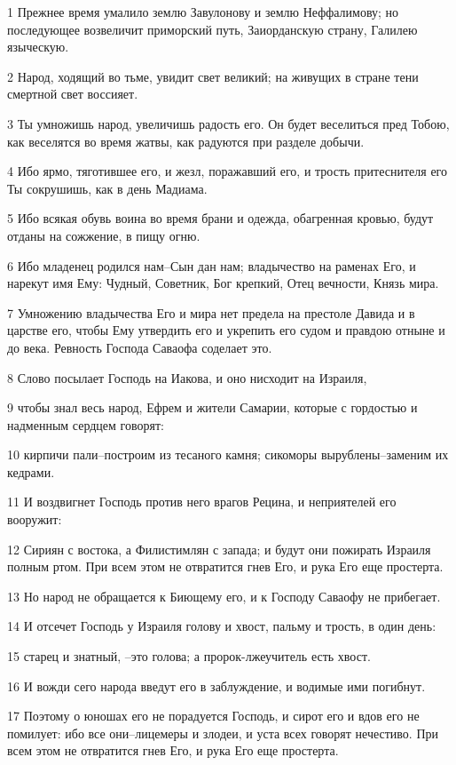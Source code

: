 \par 1 Прежнее время умалило землю Завулонову и землю Неффалимову; но последующее возвеличит приморский путь, Заиорданскую страну, Галилею языческую.
\par 2 Народ, ходящий во тьме, увидит свет великий; на живущих в стране тени смертной свет воссияет.
\par 3 Ты умножишь народ, увеличишь радость его. Он будет веселиться пред Тобою, как веселятся во время жатвы, как радуются при разделе добычи.
\par 4 Ибо ярмо, тяготившее его, и жезл, поражавший его, и трость притеснителя его Ты сокрушишь, как в день Мадиама.
\par 5 Ибо всякая обувь воина во время брани и одежда, обагренная кровью, будут отданы на сожжение, в пищу огню.
\par 6 Ибо младенец родился нам--Сын дан нам; владычество на раменах Его, и нарекут имя Ему: Чудный, Советник, Бог крепкий, Отец вечности, Князь мира.
\par 7 Умножению владычества Его и мира нет предела на престоле Давида и в царстве его, чтобы Ему утвердить его и укрепить его судом и правдою отныне и до века. Ревность Господа Саваофа соделает это.
\par 8 Слово посылает Господь на Иакова, и оно нисходит на Израиля,
\par 9 чтобы знал весь народ, Ефрем и жители Самарии, которые с гордостью и надменным сердцем говорят:
\par 10 кирпичи пали--построим из тесаного камня; сикоморы вырублены--заменим их кедрами.
\par 11 И воздвигнет Господь против него врагов Рецина, и неприятелей его вооружит:
\par 12 Сириян с востока, а Филистимлян с запада; и будут они пожирать Израиля полным ртом. При всем этом не отвратится гнев Его, и рука Его еще простерта.
\par 13 Но народ не обращается к Биющему его, и к Господу Саваофу не прибегает.
\par 14 И отсечет Господь у Израиля голову и хвост, пальму и трость, в один день:
\par 15 старец и знатный, --это голова; а пророк-лжеучитель есть хвост.
\par 16 И вожди сего народа введут его в заблуждение, и водимые ими погибнут.
\par 17 Поэтому о юношах его не порадуется Господь, и сирот его и вдов его не помилует: ибо все они--лицемеры и злодеи, и уста всех говорят нечестиво. При всем этом не отвратится гнев Его, и рука Его еще простерта.
